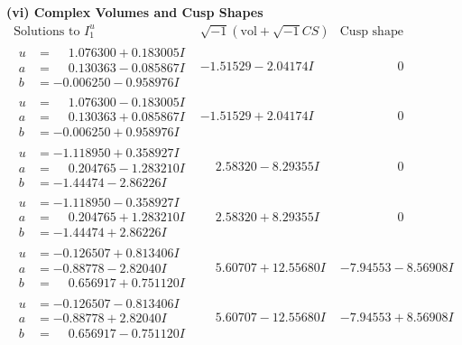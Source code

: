 \documentclass[1p]{elsarticle_modified}
\theoremstyle{definition}
\newcommand{\I}{\sqrt{-1}}
\begin{document}
\newpage\flushleft \textbf{(vi) Complex Volumes and Cusp Shapes}
$$\begin{array}{c|c|c}  
\text{Solutions to }I^u_{1}& \I (\text{vol} + \sqrt{-1}CS) & \text{Cusp shape}\\
 \hline 
\begin{aligned}
u &= \phantom{-}1.076300 + 0.183005 I \\
a &= \phantom{-}0.130363 - 0.085867 I \\
b &= -0.006250 - 0.958976 I\end{aligned}
 & -1.51529 - 2.04174 I & \phantom{-0.000000 } 0 \\ \hline\begin{aligned}
u &= \phantom{-}1.076300 - 0.183005 I \\
a &= \phantom{-}0.130363 + 0.085867 I \\
b &= -0.006250 + 0.958976 I\end{aligned}
 & -1.51529 + 2.04174 I & \phantom{-0.000000 } 0 \\ \hline\begin{aligned}
u &= -1.118950 + 0.358927 I \\
a &= \phantom{-}0.204765 - 1.283210 I \\
b &= -1.44474 - 2.86226 I\end{aligned}
 & \phantom{-}2.58320 - 8.29355 I & \phantom{-0.000000 } 0 \\ \hline\begin{aligned}
u &= -1.118950 - 0.358927 I \\
a &= \phantom{-}0.204765 + 1.283210 I \\
b &= -1.44474 + 2.86226 I\end{aligned}
 & \phantom{-}2.58320 + 8.29355 I & \phantom{-0.000000 } 0 \\ \hline\begin{aligned}
u &= -0.126507 + 0.813406 I \\
a &= -0.88778 - 2.82040 I \\
b &= \phantom{-}0.656917 + 0.751120 I\end{aligned}
 & \phantom{-}5.60707 + 12.55680 I & -7.94553 - 8.56908 I \\ \hline\begin{aligned}
u &= -0.126507 - 0.813406 I \\
a &= -0.88778 + 2.82040 I \\
b &= \phantom{-}0.656917 - 0.751120 I\end{aligned}
 & \phantom{-}5.60707 - 12.55680 I & -7.94553 + 8.56908 I \\ \hline\begin{aligned}

\end{aligned}
\end{array}$$
\end{document}
